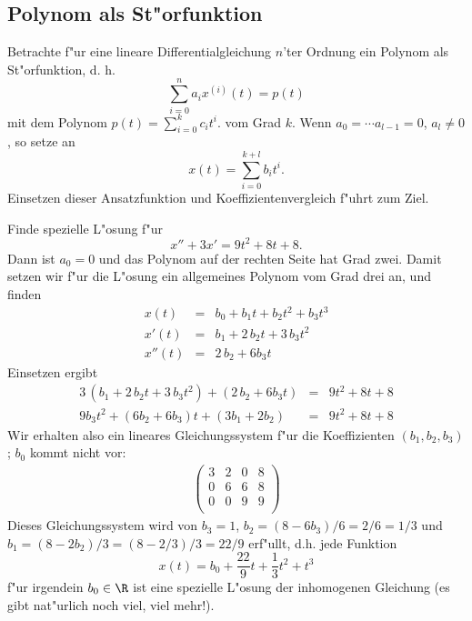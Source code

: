 \subsection{Polynom als St"orfunktion}
Betrachte f"ur eine lineare Differentialgleichung $n$'ter Ordnung ein Polynom
als St"orfunktion, d. h.  
$$ \sum_{i=0}^n a_i x^{(i)}(t) = p(t)$$
mit dem Polynom $ p(t) = \sum_{i=0}^k c_i t^i.$ vom Grad $k$. Wenn 
$a_0=\cdots a_{l-1}=0$, $a_{l}\not = 0$, so setze an
$$ x(t) = \sum_{i=0}^{k+l} b_i t^i.$$
Einsetzen dieser Ansatzfunktion und Koeffizientenvergleich f"uhrt zum Ziel.\par\medskip
\begin{bspX}
Finde spezielle L"osung f"ur 
$$ x'' + 3 x'   = 9 t^2 + 8 t + 8.$$
Dann ist $a_0=0$ und das Polynom auf der rechten Seite hat Grad zwei. Damit 
setzen wir f"ur die L"osung ein allgemeines Polynom vom Grad drei an, und finden
\begin{eqnarray*}
x(t) & = &  b_0 + b_1 t + b_2 t^2 + b_3 t^3\\
x'(t) & = &   b_1  + 2\,b_2 t + 3\,b_3 t^2\\
x''(t) & = &  2\,b_2  + 6 b_3 t
\end{eqnarray*}
Einsetzen ergibt
\begin{eqnarray*}
3\,(b_1  + 2\,b_2 t + 3\,b_3 t^2) + (2\,b_2  + 6 b_3 t)  & = & 9 t^2 + 8 t + 8\\
9 b_3  t^2 + ( 6 b_2+6 b_3)t + (3 b_1 +  2 b_2) & = & 9 t^2 + 8 t + 8
\end{eqnarray*}
Wir erhalten also ein lineares Gleichungssystem f"ur die Koeffizienten 
$( b_1, b_2, b_3)$; $b_0$ kommt nicht vor:
\begin{eqnarray*}
\left(\begin{array}{ccc|c}
3 & 2 & 0 & 8\\
0 & 6 & 6 &8\\
0 & 0 & 9 &9\\
\end{array}
\right)
\end{eqnarray*}
Dieses Gleichungssystem wird von $b_3=1$, 
$b_2=(8-6 b_3)/6 = 2/6=1/3$ und $b_1=(8-2b_2)/3 = (8-2/3)/3 = 22/9$ erf"ullt, 
d.h. jede Funktion
$$ x(t) = b_0 +\frac{22}{9}t+\frac{1}{3}t^2+t^3$$
f"ur irgendein $b_0\in\R$ ist eine spezielle L"osung der inhomogenen Gleichung 
(es gibt nat"urlich noch viel, viel mehr!).
\end{bspX}

\begin{auf}\chb\label{block4A1}

\end{auf}
